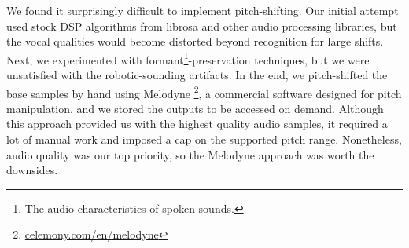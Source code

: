 We found it surprisingly difficult to implement pitch-shifting. Our initial attempt used stock DSP algorithms from librosa and other audio processing libraries, but the vocal qualities would become distorted beyond recognition for large shifts. Next, we experimented with formant\footnote{The audio characteristics of spoken sounds.}-preservation techniques, but we were unsatisfied with the robotic-sounding artifacts. In the end, we pitch-shifted the base samples by hand using Melodyne \footnote{\href{https://www.celemony.com/en/melodyne}{celemony.com/en/melodyne}}, a commercial software designed for pitch manipulation, and we stored the outputs to be accessed on demand. Although this approach provided us with the highest quality audio samples, it required a lot of manual work and imposed a cap on the supported pitch range. Nonetheless, audio quality was our top priority, so the Melodyne approach was worth the downsides.